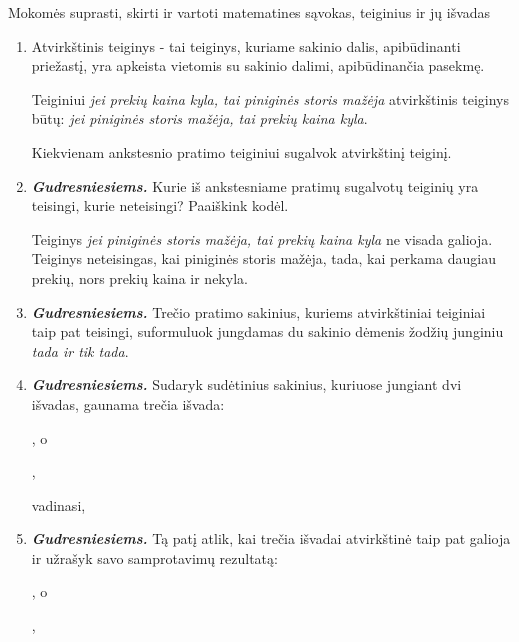 \documentclass{article}
\begin{document}
\begin{mybox}{Mokomės suprasti$\text{,}$ skirti ir vartoti matematines sąvokas$\text{,}$ teiginius ir jų išvadas}
\begin{enumerate}\addtocounter{enumi}{2}
\item Atvirkštinis teiginys - tai teiginys, kuriame sakinio dalis, apibūdinanti priežastį, yra apkeista vietomis su sakinio dalimi, apibūdinančia pasekmę. 

Teiginiui \textit{jei prekių kaina kyla, tai piniginės storis mažėja} atvirkštinis teiginys būtų: \textit{jei piniginės storis mažėja, tai prekių kaina kyla}. 

Kiekvienam ankstesnio pratimo teiginiui sugalvok atvirkštinį teiginį.

\item \textbf{\textit{Gudresniesiems.}} Kurie iš ankstesniame pratimų sugalvotų teiginių yra teisingi, kurie neteisingi? Paaiškink kodėl.

Teiginys \textit{jei piniginės storis mažėja, tai prekių kaina kyla} ne visada galioja. Teiginys neteisingas, kai piniginės storis mažėja, tada, kai perkama daugiau prekių, nors prekių kaina ir nekyla.

\item \textbf{\textit{Gudresniesiems.}} Trečio pratimo sakinius, kuriems atvirkštiniai teiginiai taip pat teisingi, suformuluok jungdamas du sakinio dėmenis žodžių junginiu \textit{tada ir tik tada}.

\item \textbf{\textit{Gudresniesiems.}} Sudaryk sudėtinius sakinius, kuriuose jungiant dvi išvadas, gaunama trečia išvada:

\textit{}, o 

\textit{},

vadinasi, \textit{}

\item \textbf{\textit{Gudresniesiems.}} Tą patį atlik, kai trečia išvadai atvirkštinė taip pat galioja ir užrašyk savo samprotavimų rezultatą:

\textit{\colorbox{blue!35!white}{}}, o 

\textit{\colorbox{blue!35!white}{}},


\end{enumerate}
\end{mybox}
\end{document}
